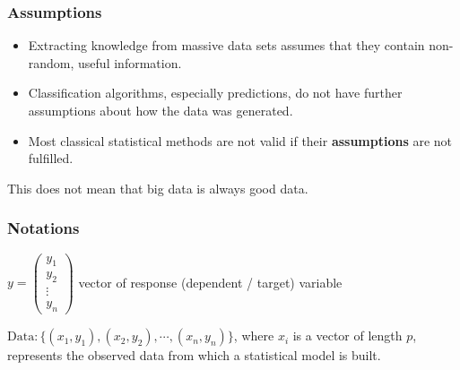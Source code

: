 \documentclass[compress]{beamer}
\begin{document}
\begin{frame}
	\frametitle{Assumptions}
	

	\begin{itemize}
		\item Extracting knowledge from massive data sets assumes that they contain non-random, useful information.
			\vspace{0.2cm}
		\item Classification algorithms, especially predictions, do not have further assumptions about how the data was generated.
			\vspace{0.2cm}
		\item Most classical statistical methods are not valid if their \textbf{assumptions} are not fulfilled.
	\end{itemize}
	\vspace{0.8cm}
	This does not mean that big data is always good data.
	
\end{frame}


\begin{frame}
	\frametitle{Notations}
	
	
	
	
	
	
	$y = \left(
	\begin{matrix}
		y_1  \\
		y_2  \\
		\vdots  \\
		y_n 
	\end{matrix} 
	\right)$  
	\small{vector of response (dependent / target) variable}
	
	\hspace{0.5cm}
	
	${\text{Data}}: \{(x_1, y_1), (x_2, y_2), \cdots, (x_n, y_n) \}$, where $x_i$ is a vector of 
	length $p$, represents the observed data from which 
	a statistical model is built. 			
\end{frame}
\end{document}
